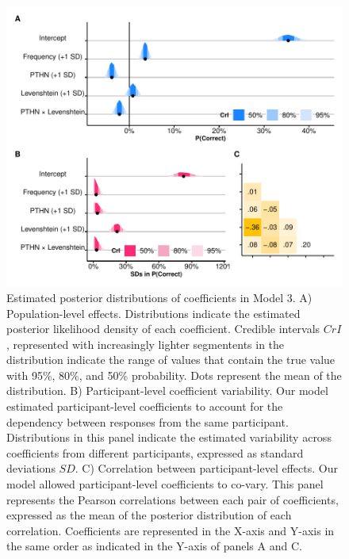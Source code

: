 \documentclass[
  english,
  man,floatsintext]{apa6}
\begin{document}
\begin{figure}
\centering
\includegraphics{manuscript_files/figure-latex/posteriorfix-1.pdf}
\caption{\label{fig:posteriorfix}Estimated posterior distributions of coefficients in Model 3. A) Population-level effects. Distributions indicate the estimated posterior likelihood density of each coefficient. Credible intervals \(CrI\), represented with increasingly lighter segmentents in the distribution indicate the range of values that contain the true value with 95\%, 80\%, and 50\% probability. Dots represent the mean of the distribution. B) Participant-level coefficient variability. Our model estimated participant-level coefficients to account for the dependency between responses from the same participant. Distributions in this panel indicate the estimated variability across coefficients from different participants, expressed as standard deviations \(SD\). C) Correlation between participant-level effects. Our model allowed participant-level coefficients to co-vary. This panel represents the Pearson correlations between each pair of coefficients, expressed as the mean of the posterior distribution of each correlation. Coefficients are represented in the X-axis and Y-axis in the same order as indicated in the Y-axis of panels A and C.}
\end{figure}
\end{document}
